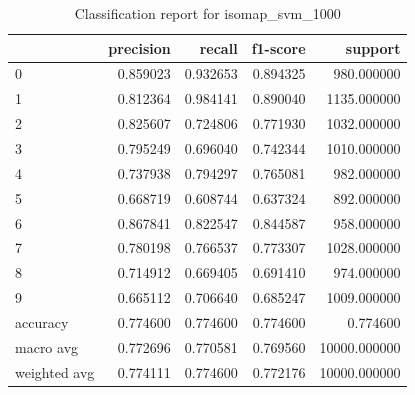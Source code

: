     \begin{table}[htb!]
        \centering
        \caption{Classification report for isomap_svm_1000}
        \label{tab:classification-report-isomap_svm_1000}
        \begin{tabular}{lrrrr}
        \toprule
        & precision & recall & f1-score & support \\
        \midrule
        0 & 0.859023 & 0.932653 & 0.894325 & 980.000000 \\
        1 & 0.812364 & 0.984141 & 0.890040 & 1135.000000 \\
        2 & 0.825607 & 0.724806 & 0.771930 & 1032.000000 \\
        3 & 0.795249 & 0.696040 & 0.742344 & 1010.000000 \\
        4 & 0.737938 & 0.794297 & 0.765081 & 982.000000 \\
        5 & 0.668719 & 0.608744 & 0.637324 & 892.000000 \\
        6 & 0.867841 & 0.822547 & 0.844587 & 958.000000 \\
        7 & 0.780198 & 0.766537 & 0.773307 & 1028.000000 \\
        8 & 0.714912 & 0.669405 & 0.691410 & 974.000000 \\
        9 & 0.665112 & 0.706640 & 0.685247 & 1009.000000 \\
        accuracy & 0.774600 & 0.774600 & 0.774600 & 0.774600 \\
        macro avg & 0.772696 & 0.770581 & 0.769560 & 10000.000000 \\
        weighted avg & 0.774111 & 0.774600 & 0.772176 & 10000.000000 \\
        \bottomrule
        \end{tabular}
        \end{table}


